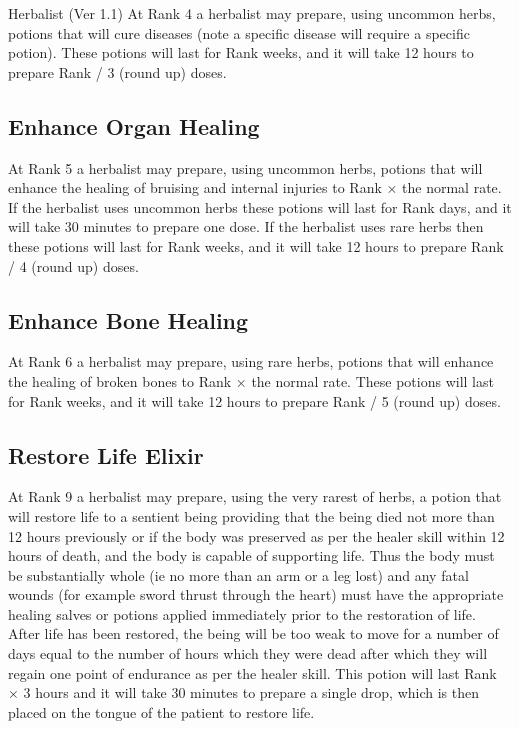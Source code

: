 \begin{Chapter}{Herbalist (Ver 1.1)}
At Rank 4 a herbalist may prepare, using uncommon herbs, potions that
will cure diseases (note a specific disease will require a specific
potion).  These potions will last for Rank weeks, and it will take 12
hours to prepare Rank / 3 (round up) doses.

\subsection{Enhance Organ Healing}

At Rank 5 a herbalist may prepare, using uncommon herbs, potions that
will enhance the healing of bruising and internal injuries to Rank ×
the normal rate.  If the herbalist uses uncommon herbs these potions
will last for Rank days, and it will take 30 minutes to prepare one
dose.  If the herbalist uses rare herbs then these potions will last
for Rank weeks, and it will take 12 hours to prepare Rank / 4 (round
up) doses.

\subsection{Enhance Bone Healing}

At Rank 6 a herbalist may prepare, using rare herbs, potions that will
enhance the healing of broken bones to Rank × the normal rate.  These
potions will last for Rank weeks, and it will take 12 hours to prepare
Rank / 5 (round up) doses.

\subsection{Restore Life Elixir}

At Rank 9 a herbalist may prepare, using the very rarest of herbs, a
potion that will restore life to a sentient being providing that the
being died not more than 12 hours previously or if the body was
preserved as per the healer skill within 12 hours of death, and the
body is capable of supporting life.  Thus the body must be
substantially whole (ie no more than an arm or a leg lost) and any
fatal wounds (for example sword thrust through the heart) must have
the appropriate healing salves or potions applied immediately prior to
the restoration of life.  After life has been restored, the being will
be too weak to move for a number of days equal to the number of hours
which they were dead after which they will regain one point of
endurance as per the healer skill. This potion will last Rank × 3
hours and it will take 30 minutes to prepare a single drop, which is
then placed on the tongue of the patient to restore life.


\end{Chapter}
